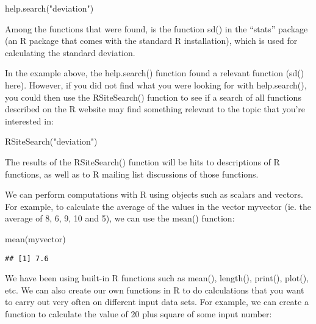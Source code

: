 \documentclass[
]{book}
\newenvironment{Shaded}{\begin{snugshade}}{\end{snugshade}}
\newcommand{\FunctionTok}[1]{\textcolor[rgb]{0.00,0.00,0.00}{#1}}
\newcommand{\NormalTok}[1]{#1}
\newcommand{\StringTok}[1]{\textcolor[rgb]{0.31,0.60,0.02}{#1}}
\begin{document}
\begin{Shaded}
\begin{Highlighting}[]
\FunctionTok{help.search}\NormalTok{(}\StringTok{"deviation"}\NormalTok{)}
\end{Highlighting}
\end{Shaded}

Among the functions that were found, is the function sd() in the ``stats'' package (an R package that comes with the standard R installation), which is used for calculating the standard deviation.

In the example above, the help.search() function found a relevant function (sd() here). However, if you did not find what you were looking for with help.search(), you could then use the RSiteSearch() function to see if a search of all functions described on the R website may find something relevant to the topic that you're interested in:

\begin{Shaded}
\begin{Highlighting}[]
\FunctionTok{RSiteSearch}\NormalTok{(}\StringTok{"deviation"}\NormalTok{)}
\end{Highlighting}
\end{Shaded}

The results of the RSiteSearch() function will be hits to descriptions of R functions, as well as to R mailing list discussions of those functions.

We can perform computations with R using objects such as scalars and vectors. For example, to calculate the average of the values in the vector myvector (ie. the average of 8, 6, 9, 10 and 5), we can use the mean() function:

\begin{Shaded}
\begin{Highlighting}[]
\FunctionTok{mean}\NormalTok{(myvector)}
\end{Highlighting}
\end{Shaded}

\begin{verbatim}
## [1] 7.6
\end{verbatim}

We have been using built-in R functions such as mean(), length(), print(), plot(), etc. We can also create our own functions in R to do calculations that you want to carry out very often on different input data sets. For example, we can create a function to calculate the value of 20 plus square of some input number:
\end{document}
